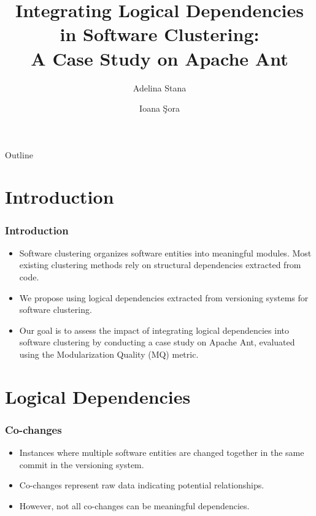 \documentclass{beamer}
\title[Pres]{Integrating Logical Dependencies in Software Clustering:\\ A Case Study on Apache Ant}
\author{Adelina Stana \and Ioana Şora}
\institute{Computer Science and Engineering Department\\
"Politehnica" University of Timișoara, Romania}
\date{}
\begin{document}
\begin{frame}
  \titlepage
\end{frame}

\begin{frame}{Outline}
  \tableofcontents
\end{frame}

\section{Introduction}

\begin{frame}
\frametitle{Introduction}
\begin{itemize}
    \item Software clustering organizes software entities into meaningful modules. Most existing clustering methods rely on structural dependencies extracted from code.
    \item We propose using logical dependencies extracted from versioning systems for software clustering.
    \item Our goal is to assess the impact of integrating logical dependencies into software clustering by conducting a case study on Apache Ant, evaluated using the Modularization Quality (MQ) metric.
\end{itemize}
\end{frame}

\section{Logical Dependencies}

\begin{frame}
\frametitle{Co-changes}
\begin{itemize}
    \item Instances where multiple software entities are changed together in the same commit in the versioning system.
    \item Co-changes represent raw data indicating potential relationships.
    \item However, not all co-changes can be meaningful dependencies.
\end{itemize}
\end{frame}
\end{document}
